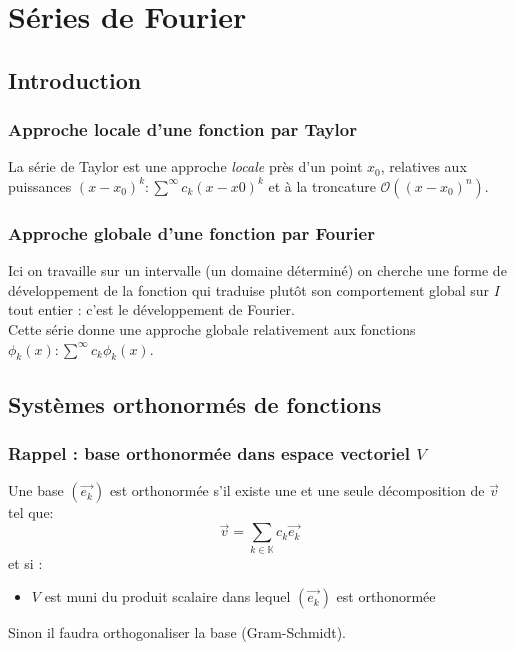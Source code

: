 \documentclass[11pt, a4paper, openany]{book}
\begin{document}
									
		\chapter{Séries de Fourier}
		\section{Introduction}
		\subsection{Approche locale d'une fonction par Taylor}
		La série de Taylor est une approche \textit{locale} près d'un point $x_0$, relatives aux puissances $(x-x_0)^k : \sum^\infty c_k(x-x0)^k$ et à la troncature $\mathcal{O}((x-x_0)^n)$.
									
		\subsection{Approche globale d'une fonction par Fourier}
		Ici on travaille sur un intervalle (un domaine déterminé) on cherche une forme de développement de la fonction qui traduise plutôt son comportement global sur $I$ tout entier : c'est le développement de Fourier.\\
		Cette série donne une approche globale relativement aux fonctions $\phi_k(x) : \sum^\infty c_k\phi_k(x)$.
									
		\section{Systèmes orthonormés de fonctions}
		\setcounter{subsection}{-1}
		\subsection{Rappel : base orthonormée dans espace vectoriel $V$}
		Une base $(\vec{e_k})$ est orthonormée s'il existe une et une seule décomposition de $\vec{v}$ tel que:
		\begin{equation}
			\vec{v} = \sum_{k\in \mathbb{K}} c_k\vec{e_k}
		\end{equation}
		et si :
		\begin{itemize}
			\item $V$ est muni du produit scalaire dans lequel $(\vec{e_k})$ est orthonormée
		\end{itemize}
		Sinon il faudra orthogonaliser la base (Gram-Schmidt).
									
\end{document}
